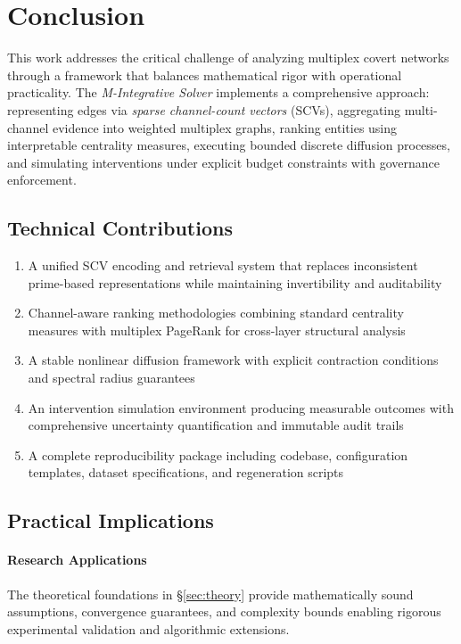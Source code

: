 \documentclass[12pt]{article}
\theoremstyle{plain}
\begin{document}
\section{Conclusion}
\label{sec:conclusion}
\noindent This work addresses the critical challenge of analyzing multiplex covert networks through a framework that balances mathematical rigor with operational practicality. The \emph{M-Integrative Solver} implements a comprehensive approach: representing edges via \emph{sparse channel-count vectors} (SCVs), aggregating multi-channel evidence into weighted multiplex graphs, ranking entities using interpretable centrality measures, executing bounded discrete diffusion processes, and simulating interventions under explicit budget constraints with governance enforcement.

\subsection{Technical Contributions}
\begin{enumerate}\itemsep0.2em
\item A unified SCV encoding and retrieval system that replaces inconsistent prime-based representations while maintaining invertibility and auditability
\item Channel-aware ranking methodologies combining standard centrality measures with multiplex PageRank for cross-layer structural analysis
\item A stable nonlinear diffusion framework with explicit contraction conditions and spectral radius guarantees
\item An intervention simulation environment producing measurable outcomes with comprehensive uncertainty quantification and immutable audit trails
\item A complete reproducibility package including codebase, configuration templates, dataset specifications, and regeneration scripts
\end{enumerate}

\subsection{Practical Implications}
\paragraph{Research Applications}
The theoretical foundations in §\ref{sec:theory} provide mathematically sound assumptions, convergence guarantees, and complexity bounds enabling rigorous experimental validation and algorithmic extensions.
\end{document}
